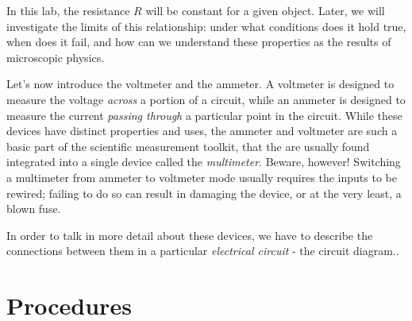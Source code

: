\documentclass[12pt]{article}
\begin{document}
In this lab, the resistance $R$ will be constant for a given object.
Later, we will investigate the limits of this relationship: under what
conditions does it hold true, when does it fail, and how can we
understand these properties as the results of microscopic physics.

Let's now introduce the voltmeter and the ammeter.  A voltmeter is
designed to measure the voltage \textit{across} a portion of a
circuit, while an ammeter is designed to measure the current
\textit{passing through} a particular point in the circuit.  While
these devices have distinct properties and uses, the ammeter and
voltmeter are such a basic part of the scientific measurement toolkit,
that the are usually found integrated into a single device called the
\textit{multimeter}.  Beware, however!  Switching a multimeter from
ammeter to voltmeter mode usually requires the inputs to be rewired;
failing to do so can result in damaging the device, or at the very
least, a blown fuse.  

In order to talk in more detail about these devices, we have to
describe the connections between them in a particular
\textit{electrical circuit} - the circuit diagram..

\section{Procedures}
\label{sec:procedures}
\end{document}
